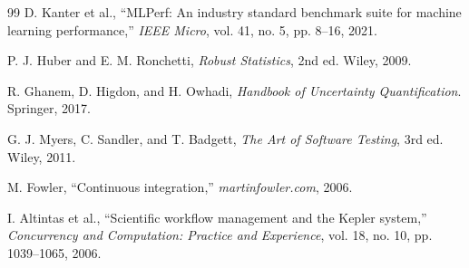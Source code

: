 \documentclass[12pt,a4paper,oneside]{report}
\begin{document}
\begin{thebibliography}{99}
D. Kanter et al., ``MLPerf: An industry standard benchmark suite for machine learning performance,'' \emph{IEEE Micro}, vol. 41, no. 5, pp. 8--16, 2021.

P. J. Huber and E. M. Ronchetti, \emph{Robust Statistics}, 2nd ed. Wiley, 2009.

R. Ghanem, D. Higdon, and H. Owhadi, \emph{Handbook of Uncertainty Quantification}. Springer, 2017.

G. J. Myers, C. Sandler, and T. Badgett, \emph{The Art of Software Testing}, 3rd ed. Wiley, 2011.

M. Fowler, ``Continuous integration,'' \emph{martinfowler.com}, 2006.

I. Altintas et al., ``Scientific workflow management and the Kepler system,'' \emph{Concurrency and Computation: Practice and Experience}, vol. 18, no. 10, pp. 1039--1065, 2006.

\end{thebibliography}
\end{document}
